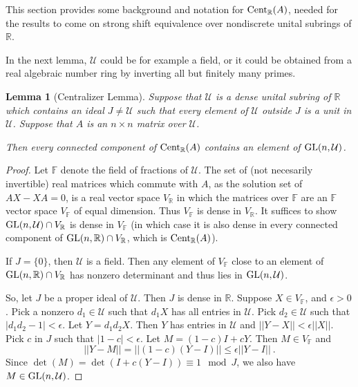\documentclass{amsart}
\newtheorem{lemma}[theorem]{Lemma}
\theoremstyle{definition}
\theoremstyle{remark}
\newcommand{\za}{\textnormal{Cent}_{\mathbb R}(A)}
\numberwithin{equation}{section}
\begin{document}
{{This section provides some background and notation 
for $\za$, needed for the results to come on 
strong shift equivalence over nondiscrete unital subrings of $\mathbb R$. 

In the next lemma,  $\mathcal U$ could be for example a field, or it 
could be obtained 
from a real algebraic number ring by inverting all but finitely
many primes.

\begin{lemma}[Centralizer Lemma]\label{centralizerlemma}
 Suppose that $\mathcal U$ is a dense unital subring of 
$\mathbb R$ which contains an ideal $J\neq \mathcal U$ 
such that every  element of $\mathcal U$ outside $J$ is a 
unit in $\mathcal U$.  Suppose that $A $ is an $n\times n$
 matrix over $\mathcal U$. 

Then every connected component of $\textnormal{Cent}_{\mathbb R}(A)$ 
contains an element of $\textnormal{GL}(n,\mathcal U)$. 
\end{lemma} 

\begin{proof} 
Let $\mathbb F$ denote the field of fractions of $\mathcal U$. 
The set of (not necesarily invertible) 
real matrices which commute with $A$, as the solution 
set of $AX-XA=0$, is a real vector space $V_{\mathbb R}$ in 
which the matrices over $\mathbb F$ are an $\mathbb F$ 
vector space $V_{\mathbb F}$ of equal dimension.
Thus  $V_{\mathbb F}$  is dense in 
$V_{\mathbb R}$. 
It suffices to show $\textnormal{GL}(n,\mathcal U) \cap V_{\mathbb R}$ 
is dense in $ V_{\mathbb F}$ (in which case   
it is 
also dense in every connected component of 
$\textnormal{GL}(n,\mathbb R) \cap V_{\mathbb R}$, which is  
$\textnormal{Cent}_{\mathbb R}(A)$).  

If $J=\{0\}$, then $\mathcal U$ is a field. 
Then any element of 
$V_{\mathbb F}$ close to an element of 
$\textnormal{GL}(n,\mathbb R) \cap V_{\mathbb R}$ has  nonzero 
determinant and thus lies in 
$\textnormal{GL}(n,\mathcal U)$. 

So, let $J$ be a proper ideal 
of $\mathcal U$. Then $J$ is dense in $\mathbb R$. 
Suppose  $X\in V_{\mathbb F}$, 
and $\epsilon >0$.  Pick a nonzero $d_1\in \mathcal U$ 
such that $d_1X$ has all entries in $\mathcal U$. 
Pick $d_2\in \mathcal U$ such that $|d_1d_2-1|< \epsilon$. Let 
$Y=d_1d_2X$. Then $Y$ has entries in $\mathcal U$ and 
$||Y-X||< \epsilon ||X||$. 
Pick $c$ in $J$ such that $|1-c|<\epsilon$. 
Let $M= (1-c)I +cY$. Then $M\in V_{\mathbb F}$ and 
\[
||Y-M||
= ||(1-c)(Y-I) || \leq \epsilon ||Y-I||\ . 
\] 
Since  $\det(M)= \det(I+c(Y-I))
 \equiv 1 \mod J$, we also have 
$M\in \textnormal{GL}(n,\mathcal U)$. 
\end{proof} 

}}
\end{document}

